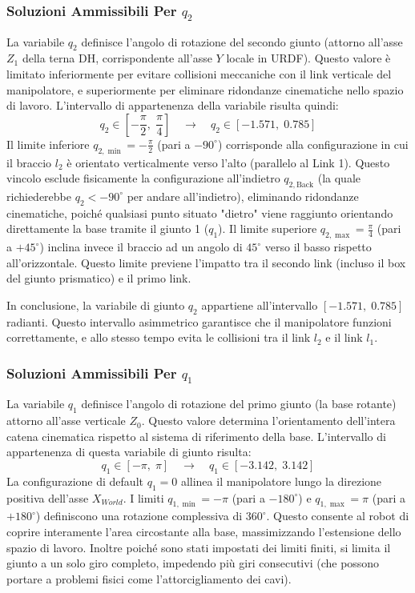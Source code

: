 ﻿\documentclass[11pt, a4paper]{article}
\begin{document}
\subsubsection*{Soluzioni Ammissibili Per $q_2$}
La variabile $q_{2}$ definisce l'angolo di rotazione del secondo giunto (attorno all'asse $Z_{1}$ della terna DH, corrispondente all'asse $Y$ locale in URDF). Questo valore è limitato inferiormente per evitare collisioni meccaniche con il link verticale del manipolatore, e superiormente per eliminare ridondanze cinematiche nello spazio di lavoro. L'intervallo di appartenenza della variabile risulta quindi:
\[
    q_2 \in \left[-\frac{\pi}{2}, \; \frac{\pi}{4}\right] \quad\longrightarrow\quad q_{2} \in [-1.571, \; 0.785]
\]
Il limite inferiore $q_{2, \min} = -\frac{\pi}{2}$ (pari a $-90^\circ$) corrisponde alla configurazione in cui il braccio $l_2$ è orientato verticalmente verso l'alto (parallelo al Link 1). Questo vincolo esclude fisicamente la configurazione all'indietro $q_{2,\text{Back}}$ (la quale richiederebbe $q_2 < -90^\circ$ per andare all'indietro), eliminando ridondanze cinematiche, poiché qualsiasi punto situato "dietro" viene raggiunto orientando direttamente la base tramite il giunto 1 ($q_1$). Il limite superiore $q_{2, \max} = \frac{\pi}{4}$ (pari a $+45^\circ$) inclina invece il braccio ad un angolo di $45^\circ$ verso il basso rispetto all'orizzontale. Questo limite previene l'impatto tra il secondo link (incluso il box del giunto prismatico) e il primo link.

In conclusione, la variabile di giunto $q_2$ appartiene all'intervallo $[-1.571, \; 0.785]$ radianti. Questo intervallo asimmetrico garantisce che il manipolatore funzioni correttamente, e allo stesso tempo evita le collisioni tra il link $l_2$ e il link $l_1$.

\subsubsection*{Soluzioni Ammissibili Per $q_1$}
La variabile $q_{1}$ definisce l'angolo di rotazione del primo giunto (la base rotante) attorno all'asse verticale $Z_0$. Questo valore determina l'orientamento dell'intera catena cinematica rispetto al sistema di riferimento della base. L'intervallo di appartenenza di questa variabile di giunto risulta:
\[
    q_1 \in [-\pi, \; \pi] \quad\longrightarrow\quad q_{1} \in [-3.142, \; 3.142]
\]
La configurazione di default $q_1 = 0$ allinea il manipolatore lungo la direzione positiva dell'asse $X_{World}$. I limiti $q_{1, \min} = -\pi$ (pari a $-180^\circ$) e $q_{1, \max} = \pi$ (pari a $+180^\circ$) definiscono una rotazione complessiva di $360^\circ$. Questo consente al robot di coprire interamente l'area circostante alla base, massimizzando l'estensione dello spazio di lavoro. Inoltre poiché sono stati impostati dei limiti finiti, si limita il giunto a un solo giro completo, impedendo più giri consecutivi (che possono portare a problemi fisici come l'attorcigliamento dei cavi).
\end{document}
